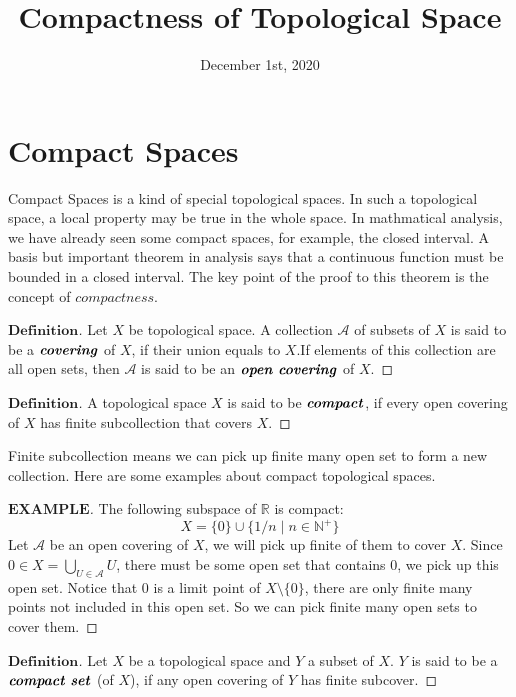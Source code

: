 \documentclass[a4paper, 11pt]{article}
\title{\textbf{Compactness of Topological Space}}
\date{December 1st, 2020}
\theoremstyle{definition}
\theoremstyle{remark}
\newenvironment{mydef}
{\renewcommand\qedsymbol{$ $}\begin{proof}[$\mathbf{Definition}$]}
  {\end{proof}}
\newenvironment{myexam}
{\renewcommand\qedsymbol{$ $}\begin{proof}[$\mathbf{EXAMPLE}$]}
  {\end{proof}}
\theoremstyle{definition}
\begin{document}
\maketitle
\section{Compact Spaces} 

\indent Compact Spaces is a kind of special topological spaces. In such a
topological space, a local property may be true in the whole space. In mathmatical
analysis, we have already seen some compact spaces, for example, the closed 
interval. A basis but important theorem in analysis says that a continuous 
function must be bounded in a closed interval. The key point of the proof to
this theorem is the concept of $\textit{compactness}$.
\vspace{0.5cm}
\begin{mydef}
        Let $X$ be topological space. A collection $\mathcal{A}$ of subsets of
        $X$ is said to be a $\textbf{\textit{covering}}$ of $X$, if their
        union equals to $X$.If elements of this collection are
        all open sets, then $\mathcal{A}$ is said to be an $\textbf{\textit{open
        covering}}$ of $X$.
\end{mydef}
\vspace{0.5cm}
\begin{mydef}
        A topological space $X$ is said to be $\textbf{\textit{compact}}$, 
        if every open covering of $X$ has finite subcollection that covers $X$.
\end{mydef}
Finite subcollection means we can pick up finite many open set to form a
new collection. Here are some examples about compact topological spaces.
\begin{myexam}
       The following subspace of $\mathbb{R}$ is compact:
       $$
       X=\{0\}\cup \{1/n\mid n\in \mathbb{N}^{+}\}
       $$
       \indent Let $\mathcal{A}$ be an open covering of $X$, we will pick up 
       finite of them to cover $X$. Since $\displaystyle
       0\in X=\bigcup_{U\in \mathcal{A}} U$, there must be some open set that
       contains 0, we pick up this open set. Notice that 0 is a limit point of 
       $X\setminus\{0\}$,  there are only finite many points not included in this
       open set. So we can pick finite many open sets to cover them.
\end{myexam}
\vspace{0.5cm}
\begin{mydef}
      Let $X$ be a topological space and $Y$ a subset of $X$. $Y$ is said to be 
      a $\textbf{\textit{compact set}}$ (of $X$), 
      if any open covering of $Y$ has finite subcover.
\end{mydef}
\end{document}
